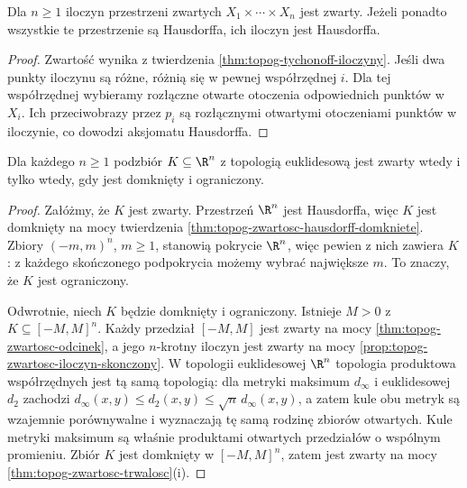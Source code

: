 \begin{stwierdzenie}
\label{prop:topog-zwartosc-iloczyn-skonczony}
Dla $n\ge1$ iloczyn przestrzeni zwartych
$X_1\times\cdots\times X_n$ jest zwarty.
Jeżeli ponadto wszystkie te przestrzenie są
Hausdorffa, ich iloczyn jest Hausdorffa.
\end{stwierdzenie}
\begin{proof}
Zwartość wynika z twierdzenia
\ref{thm:topog-tychonoff-iloczyny}.
Jeśli dwa punkty iloczynu są różne, różnią się
w pewnej współrzędnej $i$. Dla tej współrzędnej
wybieramy rozłączne otwarte otoczenia odpowiednich
punktów w $X_i$. Ich przeciwobrazy przez $p_i$
są rozłącznymi otwartymi otoczeniami punktów
w iloczynie, co dowodzi aksjomatu Hausdorffa.
\end{proof}

\begin{twierdzenie}
\label{thm:topog-heine-borel}
Dla każdego $n\ge1$ podzbiór $K\subseteq\R^n$
z topologią euklidesową jest zwarty wtedy i tylko
wtedy, gdy jest domknięty i ograniczony.
\end{twierdzenie}
\begin{proof}
Załóżmy, że $K$ jest zwarty.
Przestrzeń $\R^n$ jest Hausdorffa, więc
$K$ jest domknięty na mocy twierdzenia
\ref{thm:topog-zwartosc-hausdorff-domkniete}.
Zbiory $(-m,m)^n$, $m\ge1$, stanowią pokrycie
$\R^n$, więc pewien z nich zawiera $K$:
z każdego skończonego podpokrycia możemy wybrać
największe $m$. To znaczy, że $K$ jest ograniczony.

Odwrotnie, niech $K$ będzie domknięty i ograniczony.
Istnieje $M>0$ z $K\subseteq[-M,M]^n$.
Każdy przedział $[-M,M]$ jest zwarty na mocy
\ref{thm:topog-zwartosc-odcinek}, a jego
$n$-krotny iloczyn jest zwarty na mocy
\ref{prop:topog-zwartosc-iloczyn-skonczony}.
W topologii euklidesowej $\R^n$ topologia
produktowa współrzędnych jest tą samą topologią:
dla metryki maksimum $d_\infty$ i euklidesowej
$d_2$ zachodzi $d_\infty(x,y)\le d_2(x,y)
\le\sqrt n\,d_\infty(x,y)$, a zatem kule
obu metryk są wzajemnie porównywalne i wyznaczają
tę samą rodzinę zbiorów otwartych. Kule metryki
maksimum są właśnie produktami otwartych
przedziałów o wspólnym promieniu.
Zbiór $K$ jest domknięty w $[-M,M]^n$, zatem
jest zwarty na mocy
\ref{thm:topog-zwartosc-trwalosc}(i).
\end{proof}

